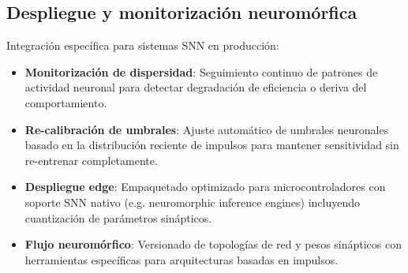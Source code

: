 \subsection{Despliegue y monitorización neuromórfica}
Integración específica para sistemas SNN en producción:
\begin{itemize}
    \item \textbf{Monitorización de dispersidad}: Seguimiento continuo de patrones de actividad neuronal para detectar degradación de eficiencia o deriva del comportamiento.
    \item \textbf{Re-calibración de umbrales}: Ajuste automático de umbrales neuronales basado en la distribución reciente de impulsos para mantener sensitividad sin re-entrenar completamente.
    \item \textbf{Despliegue edge}: Empaquetado optimizado para microcontroladores con soporte SNN nativo (e.g. neuromorphic inference engines) incluyendo cuantización de parámetros sinápticos.
    \item \textbf{Flujo neuromórfico}: Versionado de topologías de red y pesos sinápticos con herramientas específicas para arquitecturas basadas en impulsos.
\end{itemize}

